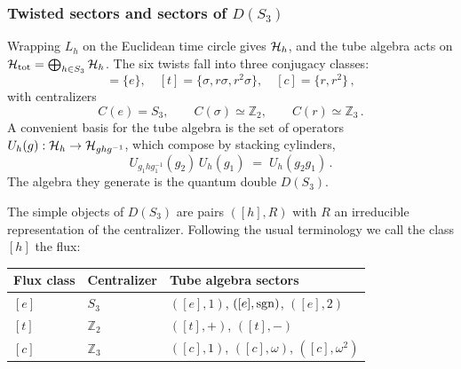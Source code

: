 \documentclass[11pt]{article}
\numberwithin{equation}{section}
\begin{document}
\subsubsection{Twisted sectors and sectors of $D(S_3)$}

Wrapping $L_h$ on the Euclidean time circle gives $\mathcal{H}_h$, and the tube algebra acts on
$\mathcal{H}_{\rm tot} = \bigoplus_{h \in S_3} \mathcal{H}_h$. The six twists fall into three conjugacy classes:
\begin{equation}
  [e] = \{e\},\quad [t] = \{\sigma, r\sigma, r^2 \sigma\},\quad [c] = \{r, r^2\} \,,
  \label{eq:S3classes}
\end{equation}
with centralizers
\begin{equation}
  C(e) = S_3, \qquad C(\sigma) \simeq \mathbb{Z}_2, \qquad C(r) \simeq \mathbb{Z}_3 \,.
  \label{eq:S3centralisers}
\end{equation}
A convenient basis for the tube algebra is the set of operators
$U_h(g) : \mathcal{H}_h \to \mathcal{H}_{ghg^{-1}}$, which compose by stacking cylinders,
\begin{equation}
  U_{g_1 h g_1^{-1}}(g_2)\, U_h(g_1) \;=\; U_h(g_2 g_1) \,.
  \label{eq:S3stack}
\end{equation}
The algebra they generate is the quantum double $D(S_3)$.

The simple objects of $D(S_3)$ are pairs $([h],R)$ with $R$ an irreducible representation of the
centralizer. Following the usual terminology we call the class $[h]$ the flux:

\begin{center}
\begin{tabular}{lll}
  \toprule
  Flux class & Centralizer & Tube algebra sectors \\
  \midrule
  $[e]$ & $S_3$ & $([e],1)$, $([e],\mathrm{sgn})$, $([e],2)$ \\
  $[t]$ & $\mathbb{Z}_2$ & $([t],+)$, $([t],-)$ \\
  $[c]$ & $\mathbb{Z}_3$ & $([c],1)$, $([c],\omega)$, $([c],\omega^2)$ \\
  \bottomrule
\end{tabular}
\end{center}
\end{document}
